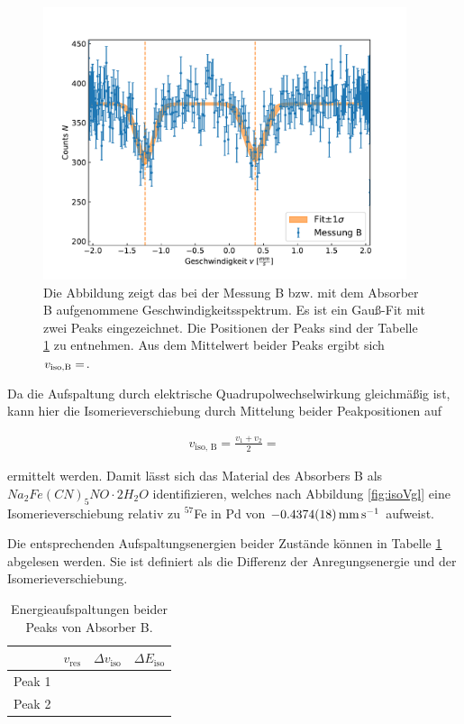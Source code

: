 \documentclass[
a4paper,                %
titlepage=firstiscover, %
captions=tableheading,  %
toc=bibliography,       %
toc=listof,             %
oneside,                %
automark,               %
12pt,                   %
english, ngerman,       %
parskip = half,         %
]{scrartcl}
\begin{document}
\begin{figure}[H]
	\centering	
	\includegraphics[width=0.95\textwidth]{dat/messungB.pdf}	
	\caption{Die Abbildung zeigt das bei der Messung B bzw. mit dem Absorber B aufgenommene Geschwindigkeitsspektrum. Es ist ein Gauß-Fit mit zwei Peaks eingezeichnet. Die Positionen der Peaks sind der Tabelle \ref{tab:isoB} zu entnehmen. Aus dem Mittelwert beider Peaks ergibt sich $v_\text{iso,B}=\protect$.}
	\label{fig:IsomerieB}
\end{figure}

\noindent Da die Aufspaltung durch elektrische Quadrupolwechselwirkung gleichmäßig ist, kann hier die Isomerieverschiebung durch Mittelung beider Peakpositionen auf

\begin{align*}
v_\text{iso, B} = \frac{v_1 + v_2}{2} = 
\end{align*}

\noindent ermittelt werden.
Damit lässt sich das Material des Absorbers B als $Na_2Fe(CN)_5NO \cdot 2H_2O$ identifizieren, welches nach Abbildung \ref{fig:isoVgl} eine Isomerieverschiebung relativ zu $^{57}$Fe in Pd von $\SI{-0.4374 \pm 0.0018}{\milli\meter\per\second}$ aufweist.

Die entsprechenden Aufspaltungsenergien beider Zustände können in Tabelle \ref{tab:isoB} abgelesen werden.
Sie ist definiert als die Differenz der Anregungsenergie und der Isomerieverschiebung.

\begin{table}[H]
	\centering
	\caption{Energieaufspaltungen beider Peaks von Absorber B.} 
	\label{tab:isoB}
	\begin{tabular}{c|ccc}
		\toprule
		&       $v_\text{res}$         &     $\Delta v_\text{iso}$      &     $\Delta E_\text{iso}$     \\ \midrule
		Peak 1 &  &  &   \\
		Peak 2 &  &  &   \\ \bottomrule
	\end{tabular}
\end{table}
\end{document}
